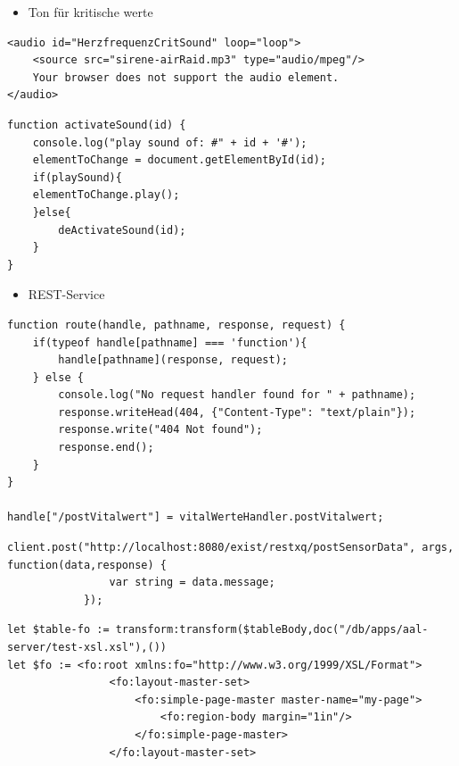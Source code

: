 \documentclass{beamer}
\begin{document}
\begin{frame}[fragile]
\begin{itemize}
	\item  Ton für kritische werte
\end{itemize}
\begin{lstlisting}
<audio id="HerzfrequenzCritSound" loop="loop">
    <source src="sirene-airRaid.mp3" type="audio/mpeg"/>
    Your browser does not support the audio element.
</audio>
\end{lstlisting}
\begin{lstlisting}
function activateSound(id) {
    console.log("play sound of: #" + id + '#');
    elementToChange = document.getElementById(id);
    if(playSound){
    elementToChange.play();
    }else{
        deActivateSound(id);
    }
}
\end{lstlisting}
\end{frame}

\begin{frame}[fragile]
\begin{itemize}
	\item REST-Service
\end{itemize}
\begin{lstlisting}
function route(handle, pathname, response, request) {
    if(typeof handle[pathname] === 'function'){
        handle[pathname](response, request);
    } else {
        console.log("No request handler found for " + pathname);
        response.writeHead(404, {"Content-Type": "text/plain"});
        response.write("404 Not found");
        response.end();
    }
}

handle["/postVitalwert"] = vitalWerteHandler.postVitalwert;
\end{lstlisting}

\end{frame}

\begin{frame}[fragile]
\begin{lstlisting}
client.post("http://localhost:8080/exist/restxq/postSensorData", args, function(data,response) {
                var string = data.message;
            });
\end{lstlisting}
\end{frame}



\begin{frame}[fragile]
\begin{lstlisting}
let $table-fo := transform:transform($tableBody,doc("/db/apps/aal-server/test-xsl.xsl"),())
let $fo := <fo:root xmlns:fo="http://www.w3.org/1999/XSL/Format">
                <fo:layout-master-set>
                    <fo:simple-page-master master-name="my-page">
                        <fo:region-body margin="1in"/>
                    </fo:simple-page-master>
                </fo:layout-master-set>
   
\end{lstlisting}
\end{frame}   
                
\end{document}
